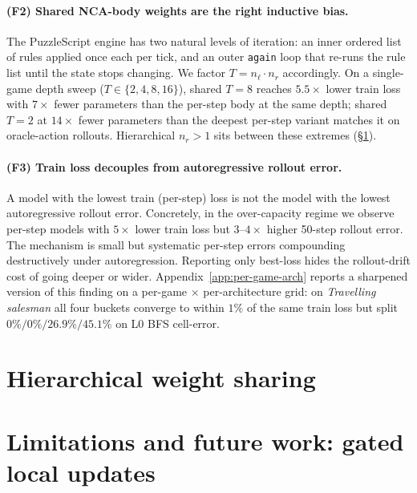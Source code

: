 \paragraph{(F2) Shared NCA-body weights are the right inductive bias.}
The PuzzleScript engine has two natural levels of iteration: an
inner ordered list of rules applied once each per tick, and an outer
\texttt{again} loop that re-runs the rule list until the state stops
changing. We factor $T = n_\ell \cdot n_r$ accordingly. On a
single-game depth sweep ($T \in \{2, 4, 8, 16\}$), shared $T{=}8$
reaches $5.5\times$ lower train loss with $7\times$ fewer parameters
than the per-step body at the same depth; shared $T{=}2$ at
$14\times$ fewer parameters than the deepest per-step variant
matches it on oracle-action rollouts. Hierarchical $n_r > 1$ sits
between these extremes (\S\ref{app:hierarchy}).

\paragraph{(F3) Train loss decouples from autoregressive rollout error.}
\label{app:F3}
A model with the lowest train (per-step) loss is not the model with
the lowest autoregressive rollout error. Concretely, in the
over-capacity regime we observe per-step models with $5\times$ lower
train loss but $3$--$4\times$ higher 50-step rollout error. The
mechanism is small but systematic per-step errors compounding
destructively under autoregression. Reporting only best-loss hides
the rollout-drift cost of going deeper or wider.
Appendix~\ref{app:per-game-arch} reports a sharpened version of this
finding on a per-game $\times$ per-architecture grid: on
\textit{Travelling salesman} all four buckets converge to within
$1\%$ of the same train loss but split
$0\% / 0\% / 26.9\% / 45.1\%$ on L0 BFS cell-error.

\section{Hierarchical weight sharing}
\label{app:hierarchy}


\section{Limitations and future work: gated local updates}
\label{app:gated-updates}

